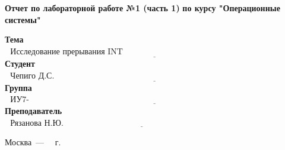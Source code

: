\begin{titlepage}
	
	\begin{center}
		\Large\textbf{Отчет по лабораторной работе №1 (часть 1)}\newline
		\Large\textbf {по курсу "Операционные системы"}\newline
	\end{center}
	
	\noindent\textbf{Тема} $\underline{\text{~~Исследование прерывания INT 8h~~~~~~~~~~~~~~~~~~~~~~~~~~~~~~~~~~~~~~~~~~~~~~~~~~~~~~~~~~~~~~~~~~~~}}$\newline\newline\newline
	\noindent\textbf{Студент} $\underline{\text{~~Чепиго Д.С. ~~~~~~~~~~~~~~~~~~~~~~~~~~~~~~~~~~~~~~~~~~~~~~~~~~~~~~~~~~~~~~~~~~~~~~~~~~~~~~~~~~~~~~~~~~~}}$\newline\newline
	\noindent\textbf{Группа} $\underline{\text{~~ИУ7-54Б~~~~~~~~~~~~~~~~~~~~~~~~~~~~~~~~~~~~~~~~~~~~~~~~~~~~~~~~~~~~~~~~~~~~~~~~~~~~~~~~~~~~~~~~~~~~~~~~~~~}}$\newline\newline
	\noindent\textbf{Преподаватель} $\underline{\text{~~Рязанова Н.Ю.~~~~~~~~~~~~~~~~~~~~~~~~~~~~~~~~~~~~~~~~~~~~~~~~~~~~~~~~~~~~~~~~~~~~~~~~~~~~~~}}$\newline
	
	\begin{center}
		\vfill
		Москва~---~\the\year
		~г.
	\end{center}
	\restoregeometry
\end{titlepage}

